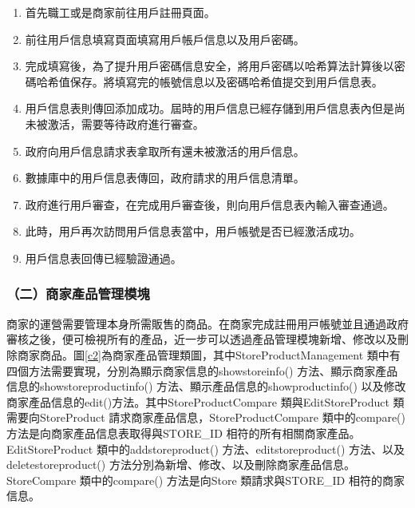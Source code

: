 	\begin{enumerate}
	\item 首先職工或是商家前往用戶註冊頁面。
	\item 前往用戶信息填寫頁面填寫用戶帳戶信息以及用戶密碼。
	\item 完成填寫後，為了提升用戶密碼信息安全，將用戶密碼以哈希算法計算後以密碼哈希值保存。將填寫完的帳號信息以及密碼哈希值提交到用戶信息表。
	\item 用戶信息表則傳回添加成功。屆時的用戶信息已經存儲到用戶信息表內但是尚未被激活，需要等待政府進行審查。
	\item 政府向用戶信息請求表拿取所有還未被激活的用戶信息。
	\item 數據庫中的用戶信息表傳回，政府請求的用戶信息清單。
	\item 政府進行用戶審查，在完成用戶審查後，則向用戶信息表內輸入審查通過。
	\item 此時，用戶再次訪問用戶信息表當中，用戶帳號是否已經激活成功。
	\item 用戶信息表回傳已經驗證通過。
	\end{enumerate}


\subsubsection{（二）商家產品管理模塊}
商家的運營需要管理本⾝所需販售的商品。在商家完成註冊⽤⼾帳號並且通過政府審核之後，便可檢視所有的產品，近⼀步可以透過產品管理模塊新增、修改以及刪除商家商品。圖\ref{c2}為商家產品管理類圖，其中StoreProductManagement 類中有四個⽅法需要實現，分別為顯⽰商家信息的showstoreinfo() ⽅法、顯⽰商家產品信息的showstoreproductinfo() ⽅法、顯⽰產品信息的showproductinfo() 以及修改商家產品信息的edit()⽅法。其中StoreProductCompare 類與EditStoreProduct 類需要向StoreProduct 請求商家產品信息，StoreProductCompare 類中的compare() ⽅法是向商家產品信息表取得與STORE\_ID 相符的所有相關商家產品。EditStoreProduct 類中的addstoreproduct() ⽅法、editstoreproduct() ⽅法、以及deletestoreproduct() ⽅法分別為新增、修改、以及刪除商家產品信息。StoreCompare 類中的compare() ⽅法是向Store 類請求與STORE\_ID 相符的商家信息。

